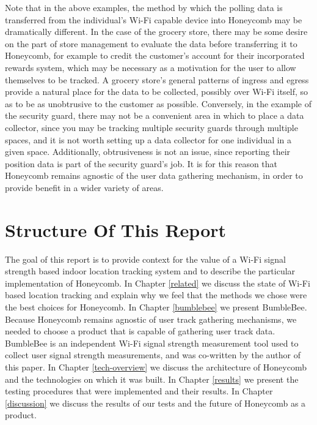 Note that in the above examples, the method by which the polling data is transferred from the individual's Wi-Fi capable device into Honeycomb may be dramatically different. In the case of the grocery store, there may be some desire on the part of store management to evaluate the data before transferring it to Honeycomb, for example to credit the customer's account for their incorporated rewards system, which may be necessary as a motivation for the user to allow themselves to be tracked. A grocery store's general patterns of ingress and egress provide a natural place for the data to be collected, possibly over Wi-Fi itself, so as to be as unobtrusive to the customer as possible. Conversely, in the example of the security guard, there may not be a convenient area in which to place a data collector, since you may be tracking multiple security guards through multiple spaces, and it is not worth setting up a data collector for one individual in a given space. Additionally, obtrusiveness is not an issue, since reporting their position data is part of the security guard's  job. It is for this reason that Honeycomb remains agnostic of the user data gathering mechanism, in order to provide benefit in a wider variety of areas.


\section{Structure Of This Report}
%

The goal of this report is to provide context for the value of a Wi-Fi signal strength based indoor location tracking system and to describe the particular implementation of Honeycomb. In Chapter \ref{related} we discuss the state of Wi-Fi based location tracking and explain why we feel that the methods we chose were the best choices for Honeycomb.  In Chapter \ref{bumblebee} we present BumbleBee. Because Honeycomb remains agnostic of user track gathering mechanisms, we needed to choose a product that is capable of gathering user track data. BumbleBee is an independent Wi-Fi signal strength measurement tool used to collect user signal strength measurements, and was co-written by the author of this paper. In Chapter \ref{tech-overview} we discuss the architecture of Honeycomb and the technologies on which it was built. In Chapter \ref{results} we present the testing procedures that were implemented and their results. In Chapter \ref{discussion} we discuss the results of our tests and the future of Honeycomb as a product.